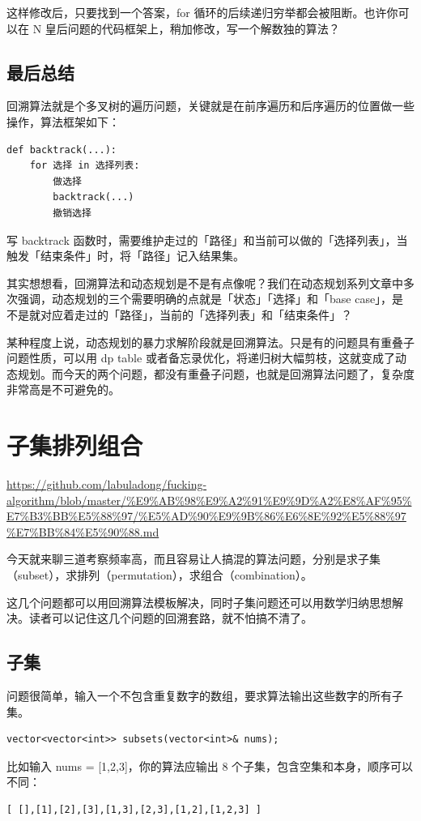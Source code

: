 \documentclass[12pt]{article}
\begin{document}
这样修改后，只要找到一个答案，for 循环的后续递归穷举都会被阻断。也许你可以在 N 皇后问题的代码框架上，稍加修改，写一个解数独的算法？

\subsection{最后总结}
回溯算法就是个多叉树的遍历问题，关键就是在前序遍历和后序遍历的位置做一些操作，算法框架如下：
\begin{lstlisting}
def backtrack(...):
    for 选择 in 选择列表:
        做选择
        backtrack(...)
        撤销选择
\end{lstlisting}

写 backtrack 函数时，需要维护走过的「路径」和当前可以做的「选择列表」，当触发「结束条件」时，将「路径」记入结果集。

其实想想看，回溯算法和动态规划是不是有点像呢？我们在动态规划系列文章中多次强调，动态规划的三个需要明确的点就是「状态」「选择」和「base case」，是不是就对应着走过的「路径」，当前的「选择列表」和「结束条件」？

某种程度上说，动态规划的暴力求解阶段就是回溯算法。只是有的问题具有重叠子问题性质，可以用 dp table 或者备忘录优化，将递归树大幅剪枝，这就变成了动态规划。而今天的两个问题，都没有重叠子问题，也就是回溯算法问题了，复杂度非常高是不可避免的。

\section{子集排列组合}
\url{https://github.com/labuladong/fucking-algorithm/blob/master/%E9%AB%98%E9%A2%91%E9%9D%A2%E8%AF%95%E7%B3%BB%E5%88%97/%E5%AD%90%E9%9B%86%E6%8E%92%E5%88%97%E7%BB%84%E5%90%88.md}

今天就来聊三道考察频率高，而且容易让人搞混的算法问题，分别是求子集（subset），求排列（permutation），求组合（combination）。

这几个问题都可以用回溯算法模板解决，同时子集问题还可以用数学归纳思想解决。读者可以记住这几个问题的回溯套路，就不怕搞不清了。

\subsection{子集}
问题很简单，输入一个不包含重复数字的数组，要求算法输出这些数字的所有子集。
\begin{lstlisting}
vector<vector<int>> subsets(vector<int>& nums);
\end{lstlisting}

比如输入 nums = [1,2,3]，你的算法应输出 8 个子集，包含空集和本身，顺序可以不同：
\begin{lstlisting}
[ [],[1],[2],[3],[1,3],[2,3],[1,2],[1,2,3] ]
\end{lstlisting}
\end{document}
